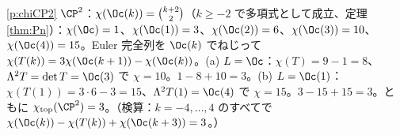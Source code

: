 \begin{sol}{\ref{p:chiCP2}}
$\CP^2$：$\chi(\Oc(k))=\binom{k+2}2$（$k\ge-2$ で多項式として成立、定理 \ref{thm:Pn}）：$\chi(\Oc)=1$、$\chi(\Oc(1))=3$、$\chi(\Oc(2))=6$、$\chi(\Oc(3))=10$、$\chi(\Oc(4))=15$。Euler 完全列を $\Oc(k)$ でねじって $\chi(T(k))=3\chi(\Oc(k+1))-\chi(\Oc(k))$。(a) $L=\Oc$：$\chi(T)=9-1=8$、$\Lambda^2T=\det T=\Oc(3)$ で $\chi=10$。$1-8+10=3$。(b) $L=\Oc(1)$：$\chi(T(1))=3\cdot6-3=15$、$\Lambda^2T(1)=\Oc(4)$ で $\chi=15$。$3-15+15=3$。ともに $\chi_{\mathrm{top}}(\CP^2)=3$。（検算：$k=-4,\dots,4$ のすべてで $\chi(\Oc(k))-\chi(T(k))+\chi(\Oc(k+3))=3$。）
\end{sol}

